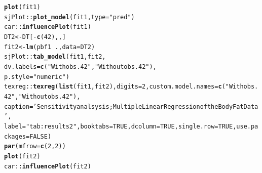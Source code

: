 \documentclass[11pt,letter]{article}\usepackage[]{graphicx}\usepackage[]{color}
\makeatletter
\newcommand{\hlnum}[1]{\textcolor[rgb]{0.686,0.059,0.569}{#1}}%
\newcommand{\hlstr}[1]{\textcolor[rgb]{0.192,0.494,0.8}{#1}}%
\newcommand{\hlopt}[1]{\textcolor[rgb]{0,0,0}{#1}}%
\newcommand{\hlstd}[1]{\textcolor[rgb]{0.345,0.345,0.345}{#1}}%
\newcommand{\hlkwb}[1]{\textcolor[rgb]{0.69,0.353,0.396}{#1}}%
\newcommand{\hlkwc}[1]{\textcolor[rgb]{0.333,0.667,0.333}{#1}}%
\newcommand{\hlkwd}[1]{\textcolor[rgb]{0.737,0.353,0.396}{\textbf{#1}}}%
\newenvironment{kframe}{%
 \def\at@end@of@kframe{}%
 \ifinner\ifhmode%
  \def\at@end@of@kframe{\end{minipage}}%
  \begin{minipage}{\columnwidth}%
 \fi\fi%
 \def\FrameCommand##1{\hskip\@totalleftmargin \hskip-\fboxsep
 \colorbox{shadecolor}{##1}\hskip-\fboxsep
     \hskip-\linewidth \hskip-\@totalleftmargin \hskip\columnwidth}%
 \MakeFramed {\advance\hsize-\width
   \@totalleftmargin\z@ \linewidth\hsize
   \@setminipage}}%
 {\par\unskip\endMakeFramed%
 \at@end@of@kframe}
\newenvironment{knitrout}{}{} %
\makeatother
\begin{document}
\begin{knitrout}
\begin{kframe}
\begin{alltt}
\hlkwd{plot}\hlstd{(fit1)}
\hlstd{sjPlot}\hlopt{::}\hlkwd{plot_model}\hlstd{(fit1,} \hlkwc{type} \hlstd{=} \hlstr{"pred"}\hlstd{)}
\hlstd{car}\hlopt{::}\hlkwd{influencePlot}\hlstd{(fit1)}
\hlstd{DT2} \hlkwb{<-} \hlstd{DT[}\hlopt{-}\hlkwd{c}\hlstd{(}\hlnum{42}\hlstd{), , ]}
\hlstd{fit2} \hlkwb{<-} \hlkwd{lm}\hlstd{(pbf1}\hlopt{~}\hlstd{.,} \hlkwc{data} \hlstd{= DT2)}
\hlstd{sjPlot}\hlopt{::}\hlkwd{tab_model}\hlstd{(fit1, fit2,}
                  \hlkwc{dv.labels} \hlstd{=} \hlkwd{c}\hlstd{(}\hlstr{"With obs. 42"}\hlstd{,}\hlstr{"Without obs. 42"}\hlstd{),}
                  \hlkwc{p.style} \hlstd{=} \hlstr{"numeric"}\hlstd{)}
\hlstd{texreg}\hlopt{::}\hlkwd{texreg}\hlstd{(}\hlkwd{list}\hlstd{(fit1,fit2),} \hlkwc{digits}\hlstd{=}\hlnum{2}\hlstd{,}\hlkwc{custom.model.names} \hlstd{=} \hlkwd{c}\hlstd{(}\hlstr{"With obs. 42"}\hlstd{,}\hlstr{"Without obs. 42"}\hlstd{),}
               \hlkwc{caption}\hlstd{=}\hlstr{'Sensitivity analsysis; Multiple Linear Regression of the Body Fat Data'}\hlstd{,}
               \hlkwc{label} \hlstd{=} \hlstr{"tab:results2"}\hlstd{,} \hlkwc{booktabs} \hlstd{=} \hlnum{TRUE}\hlstd{,} \hlkwc{dcolumn} \hlstd{=} \hlnum{TRUE}\hlstd{,} \hlkwc{single.row} \hlstd{=} \hlnum{TRUE}\hlstd{,} \hlkwc{use.packages} \hlstd{=} \hlnum{FALSE}\hlstd{)}
\hlkwd{par}\hlstd{(}\hlkwc{mfrow}\hlstd{=}\hlkwd{c}\hlstd{(}\hlnum{2}\hlstd{,}\hlnum{2}\hlstd{))}
\hlkwd{plot}\hlstd{(fit2)}
\hlstd{car}\hlopt{::}\hlkwd{influencePlot}\hlstd{(fit2)}
\end{alltt}
\end{kframe}
\end{knitrout}

\newpage
\end{document}
